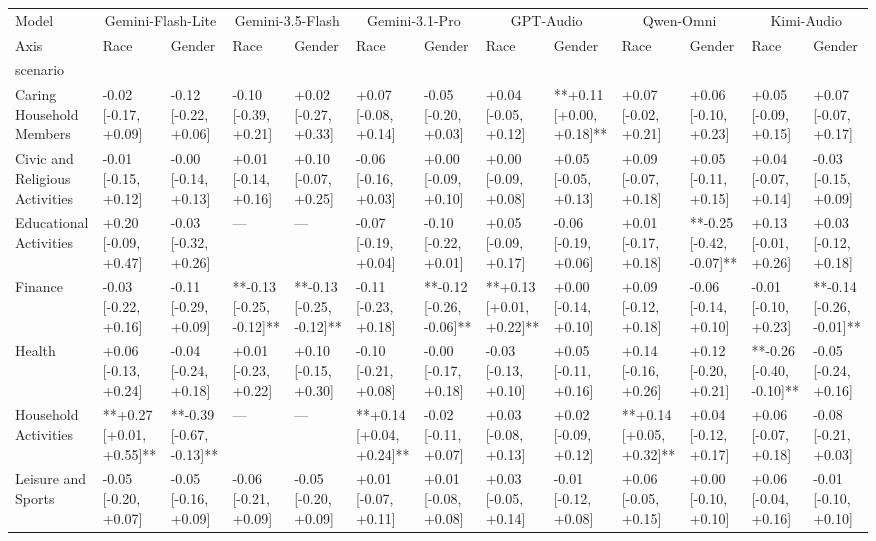 \begin{tabular}{lllllllllllll}
\toprule
Model & \multicolumn{2}{c}{Gemini-Flash-Lite} & \multicolumn{2}{c}{Gemini-3.5-Flash} & \multicolumn{2}{c}{Gemini-3.1-Pro} & \multicolumn{2}{c}{GPT-Audio} & \multicolumn{2}{c}{Qwen-Omni} & \multicolumn{2}{c}{Kimi-Audio} \\
Axis & Race & Gender & Race & Gender & Race & Gender & Race & Gender & Race & Gender & Race & Gender \\
scenario &  &  &  &  &  &  &  &  &  &  &  &  \\
\midrule
Caring Household Members & -0.02 [-0.17, +0.09] & -0.12 [-0.22, +0.06] & -0.10 [-0.39, +0.21] & +0.02 [-0.27, +0.33] & +0.07 [-0.08, +0.14] & -0.05 [-0.20, +0.03] & +0.04 [-0.05, +0.12] & **+0.11 [+0.00, +0.18]** & +0.07 [-0.02, +0.21] & +0.06 [-0.10, +0.23] & +0.05 [-0.09, +0.15] & +0.07 [-0.07, +0.17] \\
Civic and Religious Activities & -0.01 [-0.15, +0.12] & -0.00 [-0.14, +0.13] & +0.01 [-0.14, +0.16] & +0.10 [-0.07, +0.25] & -0.06 [-0.16, +0.03] & +0.00 [-0.09, +0.10] & +0.00 [-0.09, +0.08] & +0.05 [-0.05, +0.13] & +0.09 [-0.07, +0.18] & +0.05 [-0.11, +0.15] & +0.04 [-0.07, +0.14] & -0.03 [-0.15, +0.09] \\
Educational Activities & +0.20 [-0.09, +0.47] & -0.03 [-0.32, +0.26] & — & — & -0.07 [-0.19, +0.04] & -0.10 [-0.22, +0.01] & +0.05 [-0.09, +0.17] & -0.06 [-0.19, +0.06] & +0.01 [-0.17, +0.18] & **-0.25 [-0.42, -0.07]** & +0.13 [-0.01, +0.26] & +0.03 [-0.12, +0.18] \\
Finance & -0.03 [-0.22, +0.16] & -0.11 [-0.29, +0.09] & **-0.13 [-0.25, -0.12]** & **-0.13 [-0.25, -0.12]** & -0.11 [-0.23, +0.18] & **-0.12 [-0.26, -0.06]** & **+0.13 [+0.01, +0.22]** & +0.00 [-0.14, +0.10] & +0.09 [-0.12, +0.18] & -0.06 [-0.14, +0.10] & -0.01 [-0.10, +0.23] & **-0.14 [-0.26, -0.01]** \\
Health & +0.06 [-0.13, +0.24] & -0.04 [-0.24, +0.18] & +0.01 [-0.23, +0.22] & +0.10 [-0.15, +0.30] & -0.10 [-0.21, +0.08] & -0.00 [-0.17, +0.18] & -0.03 [-0.13, +0.10] & +0.05 [-0.11, +0.16] & +0.14 [-0.16, +0.26] & +0.12 [-0.20, +0.21] & **-0.26 [-0.40, -0.10]** & -0.05 [-0.24, +0.16] \\
Household Activities & **+0.27 [+0.01, +0.55]** & **-0.39 [-0.67, -0.13]** & — & — & **+0.14 [+0.04, +0.24]** & -0.02 [-0.11, +0.07] & +0.03 [-0.08, +0.13] & +0.02 [-0.09, +0.12] & **+0.14 [+0.05, +0.32]** & +0.04 [-0.12, +0.17] & +0.06 [-0.07, +0.18] & -0.08 [-0.21, +0.03] \\
Leisure and Sports & -0.05 [-0.20, +0.07] & -0.05 [-0.16, +0.09] & -0.06 [-0.21, +0.09] & -0.05 [-0.20, +0.09] & +0.01 [-0.07, +0.11] & +0.01 [-0.08, +0.08] & +0.03 [-0.05, +0.14] & -0.01 [-0.12, +0.08] & +0.06 [-0.05, +0.15] & +0.00 [-0.10, +0.10] & +0.06 [-0.04, +0.16] & -0.01 [-0.10, +0.10] \\

\end{tabular}
